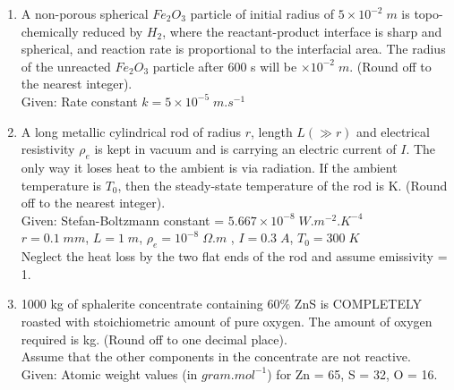 \documentclass[journal]{IEEEtran}
\theoremstyle{remark}
\begin{document}
\begin{enumerate}[resume]
\item A non-porous spherical $Fe_2O_3$ particle of initial radius of $5 \times 10^{-2}\; m$ is topo-chemically reduced by $H_2$, where the reactant-product interface is sharp and spherical, and reaction rate is proportional to the interfacial area. The radius of the unreacted $Fe_2O_3$ particle after 600 s will be \underline{\hspace{2cm}} $\times 10^{-2}\; m$. (Round off to the nearest integer). \hfill{}\\
Given: Rate constant $k = 5 \times 10^{-5}\; m.s^{-1}$

\item A long metallic cylindrical rod of radius $r$, length $L (\gg r)$ and electrical resistivity $\rho_e$ is kept in vacuum and is carrying an electric current of $I$. The only way it loses heat to the ambient is via radiation. If the ambient temperature is $T_0$, then the steady-state temperature of the rod is \underline{\hspace{2cm}} K. (Round off to the nearest integer). \hfill{}\\
Given: Stefan-Boltzmann constant = $5.667 \times 10^{-8}\; W.m^{-2}.K^{-4}$ \\
$r = 0.1\; mm$, $L = 1\; m$, $\rho_e = 10^{-8}\; \Omega.m$ ,
$I = 0.3\; A$, $T_0 = 300\; K$ \\
Neglect the heat loss by the two flat ends of the rod and assume emissivity = 1.

\item 1000 kg of sphalerite concentrate containing $60\%$ ZnS is COMPLETELY roasted with stoichiometric amount of pure oxygen. The amount of oxygen required is \underline{\hspace{2cm}} kg. (Round off to one decimal place). \hfill{}\\
Assume that the other components in the concentrate are not reactive. \\
Given: Atomic weight values (in $gram.mol^{-1}$) for Zn = 65, S = 32, O = 16.


\end{enumerate}
\end{document}
